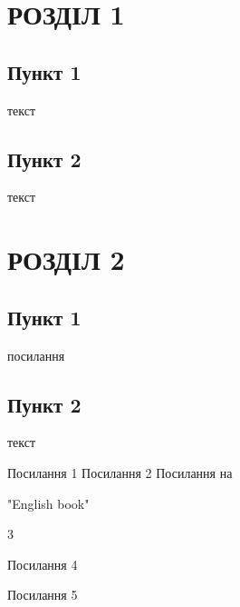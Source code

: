 \documentclass[14pt]{extarticle}
\begin{document}
\tableofcontents

\vspace{1in}

\section{РОЗДІЛ 1}
\subsection{Пункт 1}
текст
\subsection{Пункт 2}
текст
\section{РОЗДІЛ 2}
\subsection{Пункт 1}
посилання \cite{bib1,bib3,bib4,bib5}
\subsection{Пункт 2}
текст

\begin{thebibliography}{9}
Посилання 1
Посилання 2
Посилання на
\begin{otherlanguage}{english}%
"English book"%
\end{otherlanguage}
3

Посилання 4

Посилання 5

\end{thebibliography}
\end{document}
